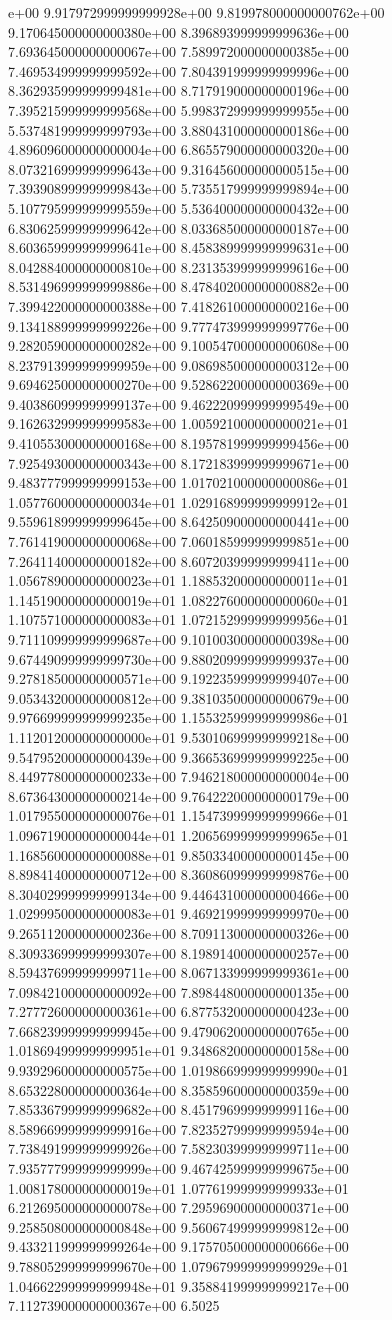 e+00	9.917972999999999928e+00	9.819978000000000762e+00	9.170645000000000380e+00	8.396893999999999636e+00	7.693645000000000067e+00	7.589972000000000385e+00	7.469534999999999592e+00	7.804391999999999996e+00	8.362935999999999481e+00	8.717919000000000196e+00	7.395215999999999568e+00	5.998372999999999955e+00	5.537481999999999793e+00	3.880431000000000186e+00	4.896096000000000004e+00	6.865579000000000320e+00	8.073216999999999643e+00	9.316456000000000515e+00	7.393908999999999843e+00	5.735517999999999894e+00	5.107795999999999559e+00	5.536400000000000432e+00	6.830625999999999642e+00	8.033685000000000187e+00	8.603659999999999641e+00	8.458389999999999631e+00	8.042884000000000810e+00	8.231353999999999616e+00	8.531496999999999886e+00	8.478402000000000882e+00	7.399422000000000388e+00	7.418261000000000216e+00	9.134188999999999226e+00	9.777473999999999776e+00	9.282059000000000282e+00	9.100547000000000608e+00	8.237913999999999959e+00	9.086985000000000312e+00	9.694625000000000270e+00	9.528622000000000369e+00	9.403860999999999137e+00	9.462220999999999549e+00	9.162632999999999583e+00	1.005921000000000021e+01	9.410553000000000168e+00	8.195781999999999456e+00	7.925493000000000343e+00	8.172183999999999671e+00	9.483777999999999153e+00	1.017021000000000086e+01	1.057760000000000034e+01	1.029168999999999912e+01	9.559618999999999645e+00	8.642509000000000441e+00	7.761419000000000068e+00	7.060185999999999851e+00	7.264114000000000182e+00	8.607203999999999411e+00	1.056789000000000023e+01	1.188532000000000011e+01	1.145190000000000019e+01	1.082276000000000060e+01	1.107571000000000083e+01	1.072152999999999956e+01	9.711109999999999687e+00	9.101003000000000398e+00	9.674490999999999730e+00	9.880209999999999937e+00	9.278185000000000571e+00	9.192235999999999407e+00	9.053432000000000812e+00	9.381035000000000679e+00	9.976699999999999235e+00	1.155325999999999986e+01	1.112012000000000000e+01	9.530106999999999218e+00	9.547952000000000439e+00	9.366536999999999225e+00	8.449778000000000233e+00	7.946218000000000004e+00	8.673643000000000214e+00	9.764222000000000179e+00	1.017955000000000076e+01	1.154739999999999966e+01	1.096719000000000044e+01	1.206569999999999965e+01	1.168560000000000088e+01	9.850334000000000145e+00	8.898414000000000712e+00	8.360860999999999876e+00	8.304029999999999134e+00	9.446431000000000466e+00	1.029995000000000083e+01	9.469219999999999970e+00	9.265112000000000236e+00	8.709113000000000326e+00	8.309336999999999307e+00	8.198914000000000257e+00	8.594376999999999711e+00	8.067133999999999361e+00	7.098421000000000092e+00	7.898448000000000135e+00	7.277726000000000361e+00	6.877532000000000423e+00	7.668239999999999945e+00	9.479062000000000765e+00	1.018694999999999951e+01	9.348682000000000158e+00	9.939296000000000575e+00	1.019866999999999990e+01	8.653228000000000364e+00	8.358596000000000359e+00	7.853367999999999682e+00	8.451796999999999116e+00	8.589669999999999916e+00	7.823527999999999594e+00	7.738491999999999926e+00	7.582303999999999711e+00	7.935777999999999999e+00	9.467425999999999675e+00	1.008178000000000019e+01	1.077619999999999933e+01	6.212695000000000078e+00	7.295969000000000371e+00	9.258508000000000848e+00	9.560674999999999812e+00	9.433211999999999264e+00	9.175705000000000666e+00	9.788052999999999670e+00	1.079679999999999929e+01	1.046622999999999948e+01	9.358841999999999217e+00	7.112739000000000367e+00	6.5025